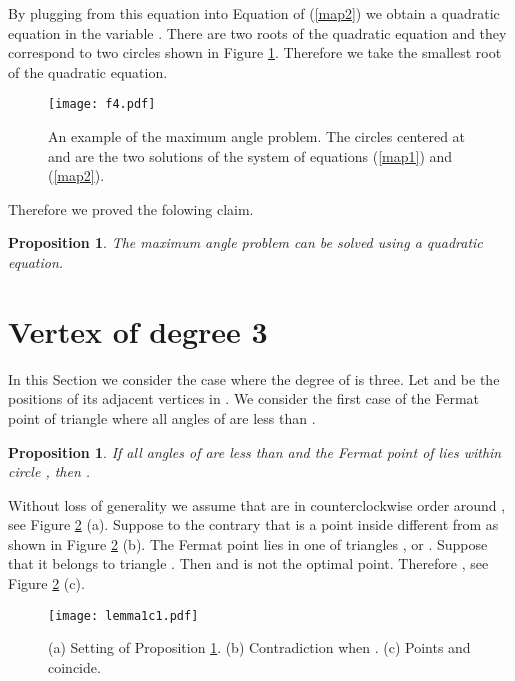 \documentclass[10pt]{article}
\newtheorem{prop}[theorem]{Proposition}
\newenvironment{proof}{\begingroup\Proof}{\qed\endgroup}
\def\Proof{\noindent{\bf Proof\/:}\nobreak}
\def\qed{\unskip~{\vrule height 4pt depth 0pt width 4pt}\medbreak}
\begin{document}
By plugging  from this equation into Equation of (\ref{map2})  we obtain a quadratic equation in the variable . There are two roots of the quadratic equation and they correspond to two circles shown in Figure \ref{f4}. Therefore we take the smallest root of the quadratic equation.


\begin{figure}[htp]
\centering
\texttt{[image: f4.pdf]}
\caption{An example of the maximum angle problem. The circles centered at  and  are the two solutions of the system of equations (\ref{map1}) and (\ref{map2}). }
\label{f4}
\end{figure}

Therefore we proved the folowing claim.
\begin{prop} \label{propdeg2a}
The maximum angle problem can be solved using a quadratic equation.
\end{prop}



\section{Vertex of degree 3}  \label{sectdeg3}

In this Section we consider the case where the degree of  is three. 
Let  and  be the positions of its adjacent vertices in .
We consider the first case of the Fermat point of triangle  where all angles of  are less than .

\begin{prop} \label{prop2}
If all angles of  are less than  and 
the Fermat point  of  lies within circle , then .
\end{prop}

\begin{proof}
Without loss of generality we assume that 
 are in counterclockwise order around , see Figure \ref{Fpoint} (a).
Suppose to the contrary that  is a point inside  different from  as shown in Figure \ref{Fpoint} (b).
The Fermat point lies in one of triangles ,  or .
Suppose that it belongs to triangle . 
Then  and  is not the optimal point. 
Therefore , see Figure \ref{Fpoint} (c).
\end{proof}

\begin{figure}[htp] 
\centering
\texttt{[image: lemma1c1.pdf]}
\caption{(a) Setting of Proposition \ref{prop2}. (b) Contradiction when .  (c)  Points   and  coincide.}
\label{Fpoint}
\end{figure}
\end{document}
